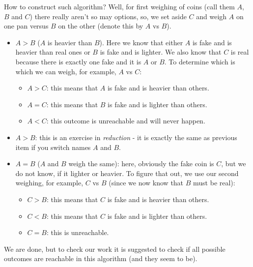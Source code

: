 \begin{problem}
How to construct such algorithm? Well, for first weighing of coins (call them $A$, $B$ and $C$) there  really aren't so may options, so, we set aside $C$ and weigh $A$ on one pan versus $B$ on the other (denote this by $A$ vs $B$). 
\begin{itemize}
\item $A>B$ ($A$ is heavier than $B$). Here we know that either $A$ is fake and is heavier than real ones or $B$ is fake and is lighter. We also know that $C$ is real because there is exactly one fake and it is $A$ or $B$. To determine which is which we can weigh, for example, $A$ vs $C$:
\begin{itemize}
\item $A>C$: this means that $A$ is fake and is heavier than others.   
\item $A=C$: this means that $B$ is fake and is lighter than others.   
\item $A<C$: this outcome is unreachable and will never happen.
\end{itemize}
\item $A>B$: this is an exercise in \textit{reduction} - it is exactly the same as previous item if you switch names $A$ and $B$.
\item $A=B$ ($A$ and $B$ weigh the same): here, obviously the fake coin is $C$, but we do not know, if it lighter or heavier. To figure that out, we use our second weighing, for example, $C$ vs $B$ (since we now know that $B$ must be real):
 \begin{itemize}
\item $C>B$: this means that $C$ is fake and is heavier than others.  
\item $C<B$: this means that $C$ is fake and is lighter than others.   
\item $C=B$: this is unreachable.
\end{itemize}
\end{itemize}

We are done, but to check our work it is suggested to check if all possible outcomes are reachable in this algorithm (and they seem to be).
\end{problem}
%
\filbreak



